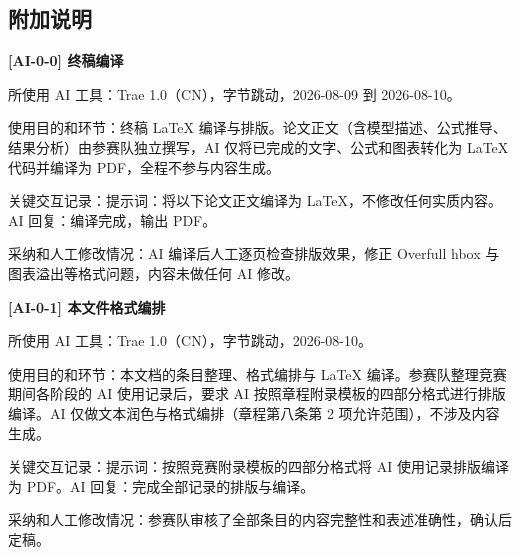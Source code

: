 \vspace{1em}
\subsection*{附加说明}

\textbf{[AI-0-0] 终稿编译}

所使用 AI 工具：Trae 1.0（CN），字节跳动，2026-08-09 到 2026-08-10。

使用目的和环节：终稿 LaTeX 编译与排版。论文正文（含模型描述、公式推导、结果分析）由参赛队独立撰写，AI 仅将已完成的文字、公式和图表转化为 LaTeX 代码并编译为 PDF，全程不参与内容生成。

关键交互记录：提示词：将以下论文正文编译为 LaTeX，不修改任何实质内容。AI 回复：编译完成，输出 PDF。

采纳和人工修改情况：AI 编译后人工逐页检查排版效果，修正 Overfull hbox 与图表溢出等格式问题，内容未做任何 AI 修改。

\vspace{0.5em}
\textbf{[AI-0-1] 本文件格式编排}

所使用 AI 工具：Trae 1.0（CN），字节跳动，2026-08-10。

使用目的和环节：本文档的条目整理、格式编排与 LaTeX 编译。参赛队整理竞赛期间各阶段的 AI 使用记录后，要求 AI 按照章程附录模板的四部分格式进行排版编译。AI 仅做文本润色与格式编排（章程第八条第 2 项允许范围），不涉及内容生成。

关键交互记录：提示词：按照竞赛附录模板的四部分格式将 AI 使用记录排版编译为 PDF。AI 回复：完成全部记录的排版与编译。

采纳和人工修改情况：参赛队审核了全部条目的内容完整性和表述准确性，确认后定稿。
